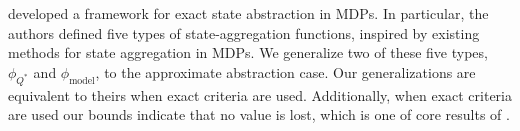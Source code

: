 \citet{li2006towards} developed a framework for exact state abstraction in \acp{MDP}. In particular, the authors defined five types of state-aggregation functions, inspired by existing methods for state aggregation in \acp{MDP}. We generalize two of these five types, $\phi_{Q^*}$ and $\phi_{\text{model}}$, to the approximate abstraction case. Our generalizations are equivalent to theirs when exact criteria are used. Additionally, when exact criteria are used our bounds indicate that no value is lost, which is one of core results of \citet{li2006towards}.

